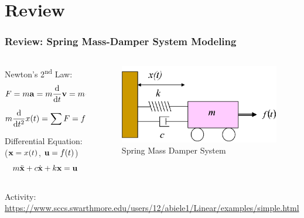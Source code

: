 \documentclass[aspectratio=169]{beamer}
\begin{document}
\begin{frame}
\begin{columns}
\begin{column}{0.3\linewidth}
		\end{column}
	\end{columns}
\end{frame}


\section{Review}
\begin{frame}
	\frametitle{Review: Spring Mass-Damper System Modeling}
	\begin{columns}
		\begin{column}{0.5 \textwidth}
			Newton's 2\textsuperscript{nd} Law:
			\[
				F = m \vb{a} 
				= m \dv{t} \vb{v} 
				= m \dv{t} \qty(\dv{t} \vb{x})
			\]
			\pause
			\[
				m \dv{t^2} x(t) 
				= \sum F 
				= f(t) - b \dv{t} x(t) - k x(t)
			\] 
			\vspace{1em}

			\pause{}
			Differential Equation: ($\vb{x} = x(t)$, $\vb{u} = f(t)$)
			\[
				m \ddot{\vb{x}} + c \dot{\vb{x}} + k \vb{x} = \vb{u}
			\]
		\end{column}
		\begin{column}{0.375 \textwidth}
			\onslide<1->
			\begin{figure}
				\includegraphics[width=\textwidth]{Images/SpringMassDamper_cartSystem.png}
				Spring Mass Damper System \cite{ctms_engin_umich_SystemModeling}
			\end{figure}
		\end{column}
	\end{columns}
	
	\footnotesize{
		Activity: 
		\url{https://www.sccs.swarthmore.edu/users/12/abiele1/Linear/examples/simple.html}
	}
\end{frame}
\end{document}
